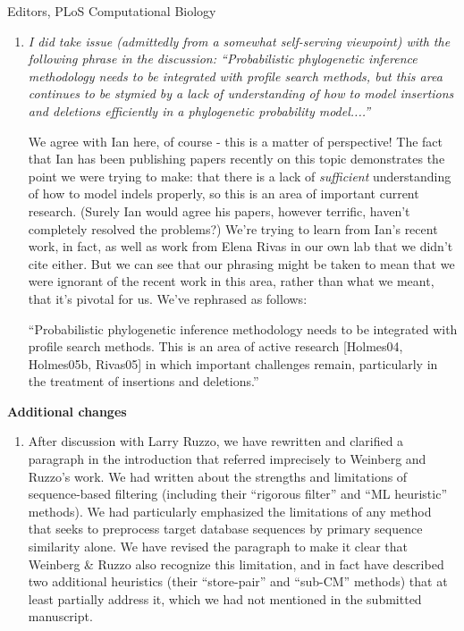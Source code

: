 \documentclass{jfrcletter}
\begin{document}
\begin{letter}{Editors, PLoS Computational Biology}
\begin{enumerate}
\item \emph{\footnotesize I did take issue (admittedly from a somewhat self-serving
   viewpoint) with the following phrase in the discussion:
   ``Probabilistic phylogenetic inference methodology needs to be
   integrated with profile search methods, but this area continues to
   be stymied by a lack of understanding of how to model insertions
   and deletions efficiently in a phylogenetic probability model....''}

   We agree with Ian here, of course - this is a matter of
   perspective!  The fact that Ian has been publishing papers recently
   on this topic demonstrates the point we were trying to make: that
   there is a lack of \emph{sufficient} understanding of how to model
   indels properly, so this is an area of important current
   research. (Surely Ian would agree his papers, however terrific,
   haven't completely resolved the problems?)  We're trying to learn
   from Ian's recent work, in fact, as well as work from Elena Rivas
   in our own lab that we didn't cite either. But we can see that our
   phrasing might be taken to mean that we were ignorant of the recent
   work in this area, rather than what we meant, that it's pivotal for
   us. We've rephrased as follows:

   ``Probabilistic phylogenetic inference methodology needs to be
   integrated with profile search methods.  This is an area of active
   research [Holmes04, Holmes05b, Rivas05] in which important
   challenges remain, particularly in the treatment of insertions and
   deletions.''
\end{enumerate}

\textbf{Additional changes}

\begin{enumerate} 
\item After discussion with Larry Ruzzo, we have rewritten and
  clarified a paragraph in the introduction that referred imprecisely
  to Weinberg and Ruzzo's work. We had written about the strengths and
  limitations of sequence-based filtering (including their ``rigorous
  filter'' and ``ML heuristic'' methods). We had particularly
  emphasized the limitations of any method that seeks to preprocess
  target database sequences by primary sequence similarity alone. We
  have revised the paragraph to make it clear that Weinberg \& Ruzzo
  also recognize this limitation, and in fact have described two
  additional heuristics (their ``store-pair'' and ``sub-CM'' methods)
  that at least partially address it, which we had not mentioned in
  the submitted manuscript.


\end{enumerate}
\end{letter}
\end{document}
